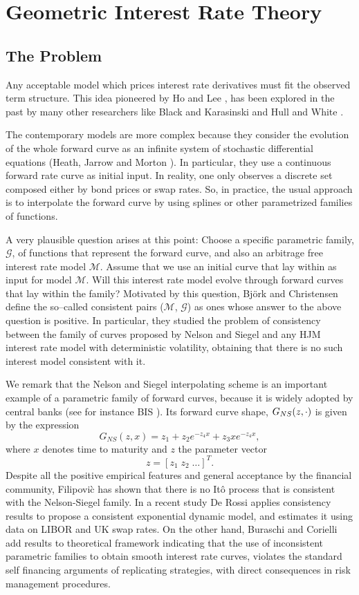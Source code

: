\chapter{Geometric Interest Rate Theory}
\section{The Problem}
Any acceptable model which prices interest rate derivatives must fit
the observed term structure. This idea pioneered by Ho and Lee
\cite{HL:1986}, has been explored  in the past by many other
researchers like Black and Karasinski \cite{BK:1991} and Hull and
White \cite{HW:1990}.	 
 
The contemporary models are more complex because they consider the
evolution of the whole forward curve as an infinite system of
stochastic differential equations (Heath, 
Jarrow and Morton \cite{HJM:1992}). In particular, they use 
a continuous forward rate curve as initial input. In reality, one only
observes a discrete set composed either by bond prices or swap
rates. So, in practice, the usual approach is to interpolate the
forward curve by using splines or other parametrized families of
functions. 

A very plausible question arises at this point: Choose a specific parametric
family, $\mathcal{G}$, of functions that represent the forward curve,
and also an arbitrage free interest rate model $\mathcal{M}$. Assume
that we use an initial 
curve that lay within as input for model $\mathcal{M}$. Will this interest rate
model evolve through forward curves that lay within the family?
Motivated by this question, Bj\"ork and Christensen \cite{BC:1999}
define the so--called consistent pairs ($\mathcal{M}$, $\mathcal{G}$)
as ones whose answer to the above  
question is positive. In particular, they studied the
problem of consistency between the family of curves proposed by Nelson
and Siegel \cite{NS:1987} and any HJM interest rate model with
deterministic volatility, obtaining that there is no such interest
model consistent with it. 

We remark that the Nelson and Siegel interpolating scheme 
is an important example of a parametric
family of forward curves, because it is widely adopted by central banks (see for
instance BIS \cite{BIS:2005}). Its forward curve shape,
$G_{NS}(\boldmath{z},\cdot)$ is given by   
the expression
$$
G_{NS}(z,x)=z_1+z_2 e^{-z_4 x}+z_3 x e^{-z_4 x},
$$
where $x$ denotes time to maturity and $z$ the parameter vector 
$$
z=[z_1\;z_2\;\dots]^T.  
$$
Despite all the positive empirical features and
general acceptance by the financial community, Filipovi\`c \cite{Fil:1999} has
shown that there is no It\^o process that is consistent with the
Nelson-Siegel family.     
In a recent study De Rossi \cite{R:2004} applies consistency results
to propose a consistent exponential dynamic model, and estimates it 
using data on LIBOR and UK swap rates. On the other hand, Buraschi and Corielli
\cite{BCo:2005} add results to theoretical framework indicating that the use of
inconsistent parametric families to obtain smooth interest rate curves, 
violates the standard self financing arguments of replicating strategies,
with direct consequences in risk management procedures.

